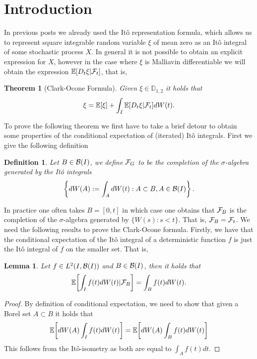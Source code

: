 \documentclass[12pt]{article}
\newtheorem{theorem}{Theorem}
\newtheorem{lemma}{Lemma}
\newtheorem{definition}{Definition}
\begin{document}
\section{Introduction}
In previous posts we already used the Itô representation formula, which allows us to represent square integrable random variable $\xi $ of mean zero as an Itô integral of some stochastic process $X$. In general it is not possible to obtain an explicit expression for $X$, however in the case where $\xi $ is Malliavin differentiable we will obtain the expression $\mathbb{E}[D_t\xi |\mathcal{F}_t]$, that is,
\begin{theorem}[Clark-Ocone Formula]
	Given $\xi \in \mathbb{D}_{1,2}$ it holds that
	\begin{equation*}
		\xi =\mathbb{E}[\xi ]+\int_{I}\mathbb{E}[D_t\xi |\mathcal{F}_t] dW(t).
	\end{equation*}
\end{theorem}
To prove the following theorem we first have to take a brief detour to obtain some properties of the conditional expectation of (iterated) Itô integrals. First we give the following definition
\begin{definition}
	Let $B\in \mathcal{B}(I)$, we define $\mathcal{F}_G$ to be the completion of the $\sigma $-algebra generated by the Itô integrals
	\begin{equation*}
		\left\{dW(A):=\int_{A}dW(t): A\subset B, A \in \mathcal{B}(I)\right\}.
	\end{equation*}

\end{definition}
In practice one often takes $B=[0,t]$ in which case one obtains that $\mathcal{F}_B$ is the completion of the $\sigma $-algebra generated by $\{W(s): s<t\}$. That is,  $\mathcal{F}_B=\mathcal{F}_t$. We need the following results to prove the Clark-Ocone formula. Firstly, we have that the conditional expectation of the Itô integral of a deterministic function $f$ is just the Itô integral of $f$ on the smaller set. That is,
\begin{lemma}
	Let $f\in L^2(I,\mathcal{B}(I))$ and $B\in \mathcal{B}(I)$, then it holds that
	\begin{equation*}
		\mathbb{E}\qty[\int_{I}f(t)dW(t)|\mathcal{F}_B]=\int_{B} f(t) dW(t).
	\end{equation*}
\end{lemma}
\begin{proof}
	By definition of conditional expectation, we need to show that given a Borel set $A \subset B$ it holds that
	\begin{equation*}
		\mathbb{E}\qty[dW(A)\int_{I}f(t)dW(t)]=\mathbb{E}\qty[dW(A)\int_{B}f(t)dW(t)]
	\end{equation*}
	This follows from the Itô-isometry as both are equal to $\int_{A}f(t) d t$.
\end{proof}
\end{document}
